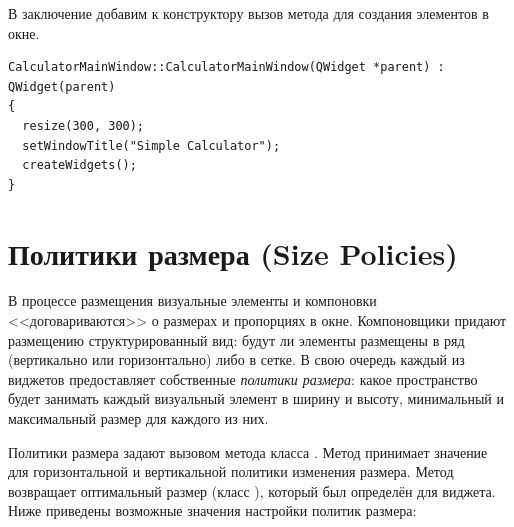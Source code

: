 В заключение добавим к конструктору вызов метода для создания элементов в окне.
\begin{lstlisting}
CalculatorMainWindow::CalculatorMainWindow(QWidget *parent) : QWidget(parent)
{
  resize(300, 300);
  setWindowTitle("Simple Calculator");
  createWidgets();
}
\end{lstlisting}

\section[Политики размера (Size Policies)]{Политики размера (Size Policies)}
В процессе размещения визуальные элементы и компоновки <<договариваются>> о размерах и пропорциях в окне. Компоновщики
придают размещению структурированный вид: будут ли элементы размещены в ряд (вертикально или горизонтально) либо в
сетке. В свою очередь каждый из виджетов предоставляет собственные \emph{политики размера}: какое пространство будет занимать каждый визуальный элемент в ширину и высоту,
минимальный и максимальный размер для каждого из них.

Политики размера задают вызовом метода  класса . Метод принимает значение для
горизонтальной и вертикальной политики изменения размера. Метод  возвращает оптимальный размер
(класс ), который был определён для виджета. Ниже приведены возможные значения
настройки политик размера:

